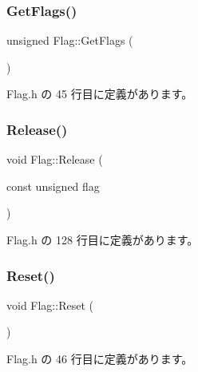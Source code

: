 \mbox{\label{class_flag_a0a2b25c70f1a7d90cd90c595b37ffc2a}} 
\subsubsection{\texorpdfstring{Get\+Flags()}{GetFlags()}}
{\footnotesize\ttfamily unsigned Flag\+::\+Get\+Flags (\begin{DoxyParamCaption}{ }\end{DoxyParamCaption})\hspace{0.3cm}{\ttfamily [inline]}}



 Flag.\+h の 45 行目に定義があります。

\mbox{\label{class_flag_a69ac5240829e3f509c64ca28b2344b6d}} 
\subsubsection{\texorpdfstring{Release()}{Release()}}
{\footnotesize\ttfamily void Flag\+::\+Release (\begin{DoxyParamCaption}\item[{const unsigned}]{flag }\end{DoxyParamCaption})\hspace{0.3cm}{\ttfamily [inline]}}



 Flag.\+h の 128 行目に定義があります。

\mbox{\label{class_flag_aef13ac09901558208fa1d8b63549c2ae}} 
\subsubsection{\texorpdfstring{Reset()}{Reset()}}
{\footnotesize\ttfamily void Flag\+::\+Reset (\begin{DoxyParamCaption}{ }\end{DoxyParamCaption})\hspace{0.3cm}{\ttfamily [inline]}}



 Flag.\+h の 46 行目に定義があります。

\mbox{\label{class_flag_a362d2f64c03c0b596004f3eba4cb14a3}} 
